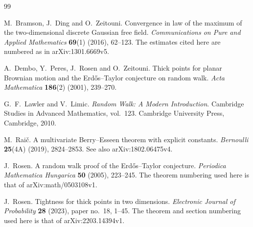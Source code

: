 \documentclass[11pt,letterpaper,reqno]{amsart}
\numberwithin{equation}{section}
\theoremstyle{remark}
\begin{document}
\clearpage
{}
{}
\begin{thebibliography}{99}
\raggedright

M.~Bramson, J.~Ding and O.~Zeitouni.
Convergence in law of the maximum of the two-dimensional discrete Gaussian free field.
\emph{Communications on Pure and Applied Mathematics} \textbf{69}(1) (2016), 62--123.
The estimates cited here are numbered as in arXiv:1301.6669v5.

A.~Dembo, Y.~Peres, J.~Rosen and O.~Zeitouni.
Thick points for planar Brownian motion and the Erd\H{o}s--Taylor conjecture on random walk.
\emph{Acta Mathematica} \textbf{186}(2) (2001), 239--270.

G.~F.~Lawler and V.~Limic.
\emph{Random Walk: A Modern Introduction}.
Cambridge Studies in Advanced Mathematics, vol.~123.
Cambridge University Press, Cambridge, 2010.

M.~Rai\v{c}.
A multivariate Berry--Esseen theorem with explicit constants.
\emph{Bernoulli} \textbf{25}(4A) (2019), 2824--2853.
See also arXiv:1802.06475v4.

J.~Rosen.
A random walk proof of the Erd\H{o}s--Taylor conjecture.
\emph{Periodica Mathematica Hungarica} \textbf{50} (2005), 223--245.
The theorem numbering used here is that of arXiv:math/0503108v1.

J.~Rosen.
Tightness for thick points in two dimensions.
\emph{Electronic Journal of Probability} \textbf{28} (2023), paper no.~18, 1--45.
The theorem and section numbering used here is that of arXiv:2203.14394v1.

\end{thebibliography}
\end{document}
